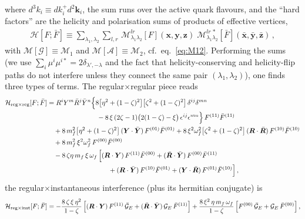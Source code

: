 \documentclass[11pt,a4paper]{article}
\newcommand{\calG}{\mathcal{G}}
\newcommand{\calA}{\mathcal{A}}
\newcommand{\calM}{\mathcal{M}}
\newcommand{\calH}{\mathcal{H}}
\newcommand{\vx}{\bm{x}}
\newcommand{\vy}{\bm{y}}
\newcommand{\vz}{\bm{z}}
\newcommand{\vxb}{\bar{\bm{x}}}
\newcommand{\vyb}{\bar{\bm{y}}}
\newcommand{\vzb}{\bar{\bm{z}}}
\newcommand{\vR}{\bm{R}}
\newcommand{\vY}{\bm{Y}}
\newcommand{\vk}{\bm{k}}
\numberwithin{equation}{section}
\begin{document}
where $d^3k_i\equiv dk_i^+d^2\vk_i$, the sum runs over the active quark flavours, and the
``hard factors'' are the helicity and polarisation sums of products of effective vertices,
\begin{align}
\label{eq:Hdef}
\calH[F;\bar F] \equiv \sum_{\lambda_{1},\lambda_{2}}\sum_{l,r}\,
\calM^{lr}_{\lambda_{1}\lambda_{2}}[F](\vx,\vy,\vz)\;
\calM^{lr\,*}_{\lambda_{1}\lambda_{2}}[\bar F](\vxb,\vyb,\vzb)\,,
\end{align}
with $\calM[\calG]\equiv\calM_1$ and $\calM[\calA]\equiv\calM_2$,
cf.~eq.~\eqref{eq:M12}. Performing the sums (we use
$\sum_i\mu^i\mu^{i*}=2\delta_{\lambda',-\lambda}$ and the fact that helicity-conserving and
helicity-flip paths do not interfere unless they connect the same pair
$(\lambda_1,\lambda_2)$), one finds three types of terms. The regular$\times$regular piece
reads
\begin{align}
\label{eq:Hregreg}
\calH_{\rm reg\times reg}[F;\bar F] &= R^{i}Y^{m}\bar{R}^{j}\bar{Y}^{n}
\Big\{8\big[\eta^{2}+(1-\zeta)^{2}\big]\big[\zeta^{2} + (1-\zeta)^{2}\big]\,
\delta^{ij}\delta^{mn}\notag\\
&\hspace*{2.6cm}-8\,\xi\,(2\zeta - 1)\big(2(1-\zeta)-\xi\big)\,
\epsilon^{ij}\epsilon^{mn}\Big\}\,F^{(11)}\bar{F}^{(11)} \notag\\
&\quad +8\,m^{2}_{f}\big[\eta^{2} + (1-\zeta)^{2}\big]\,(\vY\cdot \bar{\vY})\,
F^{(01)}\bar{F}^{(01)}
+8\,\xi^{2}\omega^{2}_{f}\big[\zeta^{2}+(1-\zeta)^{2}\big]\,(\vR\cdot \bar{\vR})\,
F^{(10)}\bar{F}^{(10)} \notag\\
&\quad + 8\,m^{2}_{f}\,\xi^{2}\omega^{2}_{f}\,F^{(00)}\bar{F}^{(00)} \notag\\
&\quad -8\,\zeta\eta\, m_{f}\,\xi\,\omega_{f}\,
\Big[(\vR\cdot \vY)\,F^{(11)}\bar{F}^{(00)} + (\bar{\vR}\cdot \bar{\vY})\,F^{(00)}\bar{F}^{(11)}
\notag\\
&\hspace*{3.2cm} + (\vR\cdot \bar{\vY})\,F^{(10)}\bar{F}^{(01)}
+ (\vY\cdot \bar{\vR})\,F^{(01)}\bar{F}^{(10)}\Big]\,,
\end{align}
the regular$\times$instantaneous interference (plus its hermitian conjugate) is
\begin{align}
\label{eq:Hreginst}
\calH_{\rm reg\times inst}[F;\bar F] = -\frac{8\,\zeta\,\xi\,\eta^{2}}{1-\zeta}\,
\Big[(\vR\cdot \vY)\,F^{(11)}\,\bar{\calG}_{E} + (\bar{\vR}\cdot \bar{\vY})\,\calG_{E}\,
\bar{F}^{(11)}\Big]
+\frac{8\,\xi^{2}\,\eta\,m_{f}\,\omega_{f}}{1-\zeta}\,
\Big[F^{(00)}\,\bar{\calG}_{E} + \calG_{E}\,\bar{F}^{(00)}\Big]\,,
\end{align}
\end{document}

